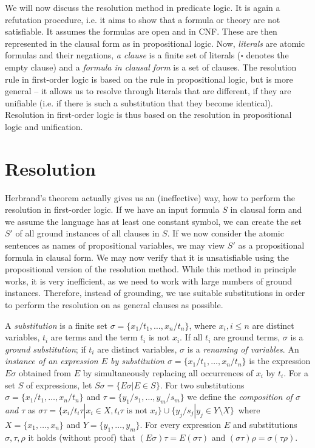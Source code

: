 We will now discuss the resolution method in predicate logic. It is again a refutation procedure, i.e. it aims to show that a formula or theory are not satisfiable. It assumes the formulas are open and in CNF. These are then represented in the clausal form as in propositional logic. Now, \emph{literals} are atomic formulas and their negations, \emph{a clause} is a finite set of literals ($\square$ denotes the empty clause) and a \emph{formula in clausal form} is a set of clauses. The resolution rule in first-order logic is based on the rule in propositional logic, but is more general -- it allows us to resolve through literals that are different, if they are unifiable (i.e. if there is such a substitution that they become identical). Resolution in first-order logic is thus based on the resolution in propositional logic and unification.

\section{Resolution}

Herbrand's theorem actually gives us an (ineffective) way, how to perform the resolution in first-order logic. If we have an input formula $S$ in clausal form and we assume the language has at least one constant symbol, we can create the set $S'$ of all ground instances of all clauses in $S$. If we now consider the atomic sentences as names of propositional variables, we may view $S'$ as a propositional formula in clausal form. We may now verify that it is unsatisfiable using the propositional version of the resolution method. While this method in principle works, it is very inefficient, as we need to work with large numbers of ground instances. Therefore, instead of grounding, we use suitable substitutions in order to perform the resolution on as general clauses as possible.

A \emph{substitution} is a finite set $\sigma = \{x_1/t_1, \dots, x_n/t_n\}$, where $x_i, i \leq n$ are distinct variables, $t_i$ are terms and the term $t_i$ is not $x_i$. If all $t_i$ are ground terms, $\sigma$ is a \emph{ground substitution}; if $t_i$ are distinct variables, $\sigma$ is a \emph{renaming of variables}. An \emph{instance of an expression $E$ by substitution $\sigma = \{x_1/t_1, \dots, x_n/t_n\}$} is the expression $E \sigma$ obtained from $E$ by simultaneously replacing all occurrences of $x_i$ by $t_i$. For a set $S$ of expressions, let $S \sigma = \{E \sigma| E \in S\}$. For two substitutions $\sigma = \{x_1/t_1, \dots, x_n/t_n\}$ and $\tau = \{y_1/s_1, \dots, y_m/s_m\}$ we define the \emph{composition of $\sigma$ and $\tau$} as $\sigma \tau = \{x_i/t_i \tau| x_i \in X, t_i \tau\text{ is not }x_i\} \cup \{y_j/s_j|y_j \in Y \setminus X\}\,$ where $X = \{x_1, \dots, x_n\}$ and $Y = \{y_1, \dots, y_m\}$. For every expression $E$ and substitutions $\sigma, \tau, \rho$ it holds (without proof) that $(E \sigma)\tau = E(\sigma \tau)$ and $(\sigma \tau)\rho = \sigma(\tau \rho)$.

